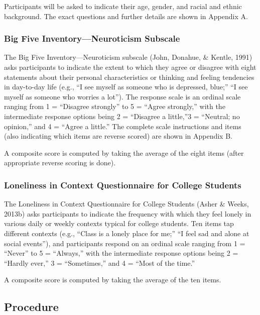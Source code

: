 \documentclass[
  english,
  man]{apa6}
\begin{document}
Participants will be asked to indicate their age, gender, and racial and ethnic background. The exact questions and further details are shown in Appendix A.

\subsubsection{Big Five Inventory---Neuroticism Subscale}\label{big-five-inventoryneuroticism-subscale}

The Big Five Inventory---Neuroticism subscale (John, Donahue, \& Kentle, 1991) asks participants to indicate the extent to which they agree or disagree with eight statements about their personal characteristics or thinking and feeling tendencies in day-to-day life (e.g., ``I see myself as someone who is depressed, blue;'' ``I see myself as someone who worries a lot''). The response scale is an ordinal scale ranging from 1 = ``Disagree strongly'' to 5 = ``Agree strongly,'' with the intermediate response options being 2 = ``Disagree a little,''3 = ``Neutral; no opinion,'' and 4 = ``Agree a little.'' The complete scale instructions and items (also indicating which items are reverse scored) are shown in Appendix B.

A composite score is computed by taking the average of the eight items (after appropriate reverse scoring is done).

\subsubsection{Loneliness in Context Questionnaire for College Students}\label{loneliness-in-context-questionnaire-for-college-students}

The Loneliness in Context Questionnaire for College Students (Asher \& Weeks, 2013b) asks participants to indicate the frequency with which they feel lonely in various daily or weekly contexts typical for college students. Ten items tap different contexts (e.g., ``Class is a lonely place for me;'' ``I feel sad and alone at social events''), and participants respond on an ordinal scale ranging from 1 = ``Never'' to 5 = ``Always,'' with the intermediate response options being 2 = ``Hardly ever,'' 3 = ``Sometimes,'' and 4 = ``Most of the time.''

A composite score is computed by taking the average of the ten items.

\subsection{Procedure}\label{procedure}
\end{document}
